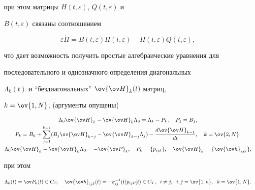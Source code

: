 при этом матрицы $H(t,\varepsilon)$, $Q(t,\varepsilon)$ и 


$B(t,\varepsilon)$ связаны соотношением 


$$ 


\varepsilon\Dot H=B(t,\varepsilon)H(t,\varepsilon)- 


H(t,\varepsilon)Q(t,\varepsilon), 


$$ 


что дает возможность получить простые алгебраические уравнения для  


последовательного и однозначного определения диагональных 


$\Lambda_k(t)$ и ``бездиагональных'' $\ov{\ov H}_k(t)$ матриц,


$k=\ov{1,N}$, (аргументы опущены) 


\begin{gather*} 


\Lambda_0\ov{\ov H}_k-\ov{\ov H}_k\Lambda_0=\Lambda_k-P_k,\quad 


P_1=B_1,\\ 


P_k=B_k+\sum^{k-1}_{j=1}(B_j \ov{\ov H}_{k-j}-\ov{\ov H}_{k-j}\Lambda_j)- 


\frac{d \ov{\ov H}_{k-1}}{dt},\quad k=\ov{2,N},\\ 


\Lambda_0\ov{\ov H}_k-\ov{\ov H}_k\Lambda_0=-\ov{\ov P}_k,\quad 


P_k=\{p_{i j k}\},\quad \ov{\ov H}_k=\{\ov{\ov h}_{i j k}\}, 


\end{gather*} 


при этом 


$$ 


\Lambda_k(t)=\ov P_k(t)\in C_T,\quad 


\ov{\ov h}_{i j k}(t)=-\sigma^{-1}_{i j}(t)p_{i j k}(t)\in C_T, 


\ \; i\ne j,\ \; i,j=\ov{1,n},\ \; k=\ov{1,N}. 


$$ 


 


